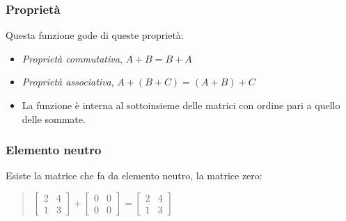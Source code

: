 \documentclass[a4paper]{article}
\begin{document}
\subsubsection{Proprietà}
Questa funzione gode di queste proprietà:
\begin{itemize}
\item \textit{Proprietà commutativa}, $A + B = B + A$
\item \textit{Proprietà associativa}, $A + (B + C) = (A + B) + C$
\item La funzione è interna al sottoinsieme delle matrici con ordine pari a quello delle sommate.
\end{itemize}

\subsubsection{Elemento neutro}
Esiste la matrice che fa da elemento neutro, la matrice zero: 
\\
\begin{quote} \centering $\left[\begin{matrix}2 & 4 \\ 1 & 3\end{matrix}\right] + \left[\begin{matrix}0 & 0 \\ 0 & 0\end{matrix}\right] = \left[\begin{matrix}2 & 4 \\ 1 & 3\end{matrix}\right]
$\end{quote}
\end{document}
